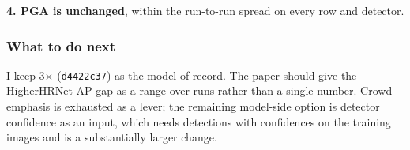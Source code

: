 \textbf{4. PGA is unchanged}, within the run-to-run spread on every row and detector.

\subsubsection{What to do next}

I keep 3$\times$ (\texttt{d4422c37}) as the model of record.
The paper should give the HigherHRNet AP gap as a range over runs rather than a single number.
Crowd emphasis is exhausted as a lever; the remaining model-side option is detector confidence as an input, which needs detections with confidences on the training images and is a substantially larger change.
